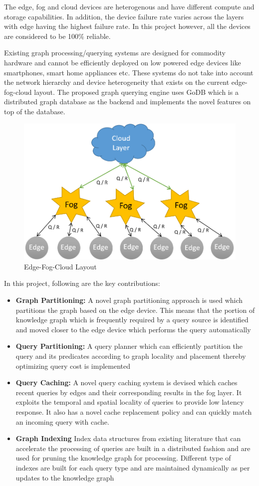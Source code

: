 \documentclass[conference]{IEEEtran}
\begin{document}
The edge, fog and cloud devices are heterogenous and have different compute and storage capabilities. In addition, the device failure rate varies across the layers with edge having the highest failure rate. In this project however, all the devices are considered to be 100\% reliable.

Existing graph processing/querying systems are designed for commodity hardware and cannot be efficiently deployed on low powered edge devices like smartphones, smart home appliances etc. These systems do not take into account the network hierarchy and device heterogeneity that exists on the current edge-fog-cloud layout. The proposed graph querying engine uses GoDB which is a distributed graph database as the backend and implements the novel features on top of the database.

\begin{figure}[!t]
	\centering
	\includegraphics[width=0.75\columnwidth]{1.png}
	\caption{Edge-Fog-Cloud Layout}
	\label{fig:1}
\end{figure}
In this project, following are the key contributions:
\begin{itemize}%
	\item \textbf{Graph Partitioning:} A novel graph partitioning approach is used which partitions the graph based on the edge device. This means that the portion of knowledge graph which is frequently required by a query source is identified and moved closer to the edge device which performs the query automatically 
	\item \textbf{Query Partitioning:} A query planner which can efficiently partition the query and its predicates according to graph locality and placement thereby optimizing query cost is implemented
	\item \textbf{Query Caching:} A novel query caching system is devised which caches recent queries by edges and their corresponding results in the fog layer. It exploits the temporal and spatial locality of queries to provide low latency response. It also has a novel cache replacement policy and can quickly match an incoming query with cache. 
	\item \textbf{Graph Indexing} Index data structures from existing literature that can accelerate the processing of queries are built in a distributed fashion and are used for pruning the knowledge graph for processing. Different type of indexes are built for each query type and are maintained dynamically as per updates to the knowledge graph    
\end{itemize}
\end{document}
